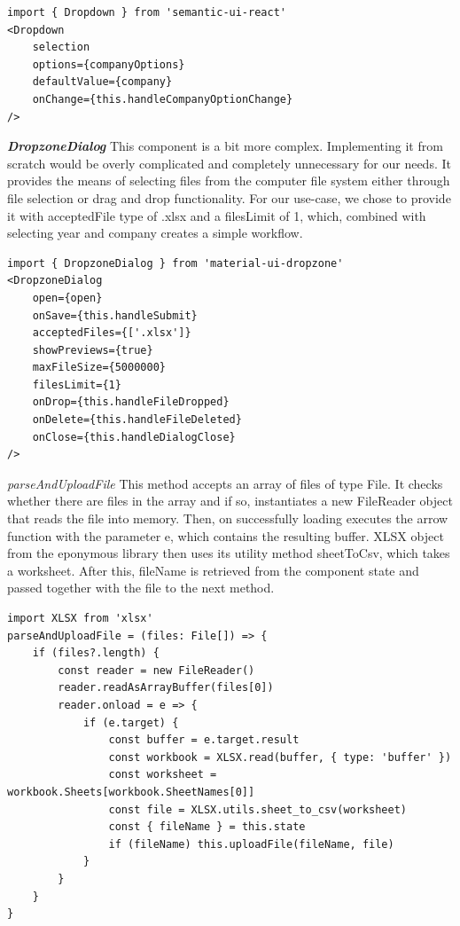 \documentclass[12pt,oneside]{fithesis2}
\begin{document}
\begin{lstlisting}[style=htmlcssjs]
import { Dropdown } from 'semantic-ui-react'
<Dropdown
    selection
    options={companyOptions}
    defaultValue={company}
    onChange={this.handleCompanyOptionChange}
/>
\end{lstlisting}

\textit{\textbf{DropzoneDialog}} This component is a bit more complex. Implementing it from scratch would be overly complicated and completely unnecessary for our needs. It provides the means of selecting files from the computer file system either through file selection or drag and drop functionality. For our use-case, we chose to provide it with acceptedFile type of .xlsx and a filesLimit of 1, which, combined with selecting year and company creates a simple workflow.

\begin{lstlisting}[style=htmlcssjs]
import { DropzoneDialog } from 'material-ui-dropzone'
<DropzoneDialog
	open={open}
	onSave={this.handleSubmit}
	acceptedFiles={['.xlsx']}
	showPreviews={true}
	maxFileSize={5000000}
	filesLimit={1}
	onDrop={this.handleFileDropped}
	onDelete={this.handleFileDeleted}
	onClose={this.handleDialogClose}
/>
\end{lstlisting}

\textit{\large{parseAndUploadFile}} This method accepts an array of files of type File. It checks whether there are files in the array and if so, instantiates a new FileReader object that reads the file into memory. Then, on successfully loading executes the arrow function with the parameter e, which contains the resulting buffer. XLSX object from the eponymous library then uses its utility method sheetToCsv, which takes a worksheet. After this, fileName is retrieved from the component state and passed together with the file to the next method.

\begin{lstlisting}[style=htmlcssjs]
import XLSX from 'xlsx'
parseAndUploadFile = (files: File[]) => {
	if (files?.length) {
		const reader = new FileReader()
		reader.readAsArrayBuffer(files[0])
		reader.onload = e => {
			if (e.target) {
				const buffer = e.target.result
				const workbook = XLSX.read(buffer, { type: 'buffer' })
				const worksheet = workbook.Sheets[workbook.SheetNames[0]]
				const file = XLSX.utils.sheet_to_csv(worksheet)
				const { fileName } = this.state
				if (fileName) this.uploadFile(fileName, file)
			}
		}
	}
}
\end{lstlisting}
\end{document}
